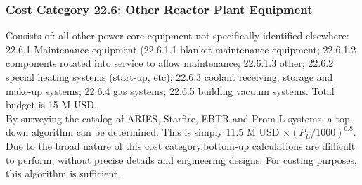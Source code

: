 \subsubsection{Cost Category 22.6: Other Reactor Plant Equipment}
Consists of: all other power core equipment not specifically identified elsewhere: 22.6.1 Maintenance equipment (22.6.1.1 blanket maintenance equipment; 22.6.1.2 components rotated into service to
allow maintenance; 22.6.1.3 other; 22.6.2 special heating systems (start-up, etc); 22.6.3 coolant receiving, storage and make-up systems; 22.6.4 gas systems; 22.6.5 building vacuum systems.  Total budget is 15 M USD.\\

By surveying the catalog of ARIES, Starfire, EBTR and Prom-L systems, a top-down algorithm can be determined. This is simply $11.5$ M USD $\times (P_E/1000)^{0.8}$. Due to the broad nature of this cost category,bottom-up calculations are difficult to perform, without precise details and engineering designs. For costing purposes, this algorithm is sufficient.